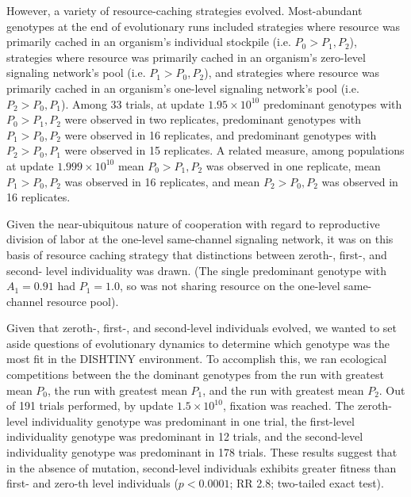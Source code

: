 However, a variety of resource-caching strategies evolved.
Most-abundant genotypes at the end of evolutionary runs included strategies where resource was primarily cached in an organism's individual stockpile (i.e. $P_0 > P_1, P_2$), strategies where resource was primarily cached in an organism's zero-level signaling network's pool (i.e. $P_1 > P_0, P_2$), and strategies where resource was primarily cached in an organism's one-level signaling network's pool (i.e. $P_2 > P_0, P_1$).
Among 33 trials, at update $1.95 \times 10^{10}$ predominant genotypes with $P_0 > P_1, P_2$ were observed in two replicates, predominant genotypes with $P_1 > P_0, P_2$ were observed in 16 replicates, and predominant genotypes with $P_2 > P_0, P_1$ were observed in 15 replicates.
A related measure, among populations at update $1.999 \times 10^{10}$ mean $P_0 > P_1, P_2$ was observed in one replicate, mean $P_1 > P_0, P_2$ was observed in 16 replicates, and mean $P_2 > P_0, P_2$ was observed in 16 replicates.

Given the near-ubiquitous nature of cooperation with regard to reproductive division of labor at the one-level same-channel signaling network, it was on this basis of resource caching strategy that distinctions between zeroth-, first-, and second- level individuality was drawn.
(The single predominant genotype with $A_1 = 0.91$ had $P_1 = 1.0$, so was not sharing resource on the one-level same-channel resource pool).

Given that zeroth-, first-, and second-level individuals evolved, we wanted to set aside questions of evolutionary dynamics to determine which genotype was the most fit in the DISHTINY environment.
To accomplish this, we ran ecological competitions between the the dominant genotypes from the run with greatest mean $P_0$, the run with greatest mean $P_1$, and the run with greatest mean $P_2$.
Out of 191 trials performed, by update $1.5 \times 10^{10}$, fixation was reached.
The zeroth-level individuality genotype was predominant in one trial, the first-level individuality genotype was predominant in 12 trials, and the second-level individuality genotype was predominant in 178 trials.
These results suggest that in the absence of mutation, second-level individuals exhibits greater fitness than first- and zero-th level individuals ($p < 0.0001$; RR 2.8; two-tailed exact test).

